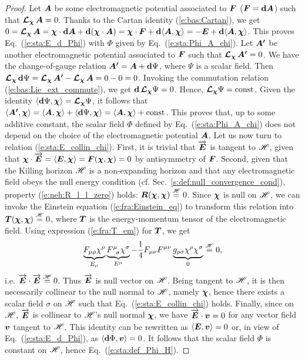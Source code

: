 \begin{proof}
Let $\bm{A}$ be some electromagnetic potential associated to $\bm{F}$ ($\bm{F} = \mathbf{d} \bm{A}$)
such that $\bm{\mathcal{L}}_{\bm{\chi}}\, \bm{A} = 0$.
Thanks to the Cartan identity (\ref{e:bas:Cartan}), we get
$0 = \bm{\mathcal{L}}_{\bm{\chi}}\, \bm{A} = \bm{\chi}\cdot\mathbf{d}\bm{A}
    + \mathbf{d}(\bm{\chi}\cdot\bm{A}) = \bm{\chi}\cdot\bm{F} + \mathbf{d} \langle \bm{A}, \bm{\chi} \rangle
    = -\bm{E} + \mathbf{d} \langle \bm{A}, \bm{\chi} \rangle $. This proves Eq.~(\ref{e:sta:E_d_Phi})
with $\Phi$ given by Eq.~(\ref{e:sta:Phi_A_chi}).
Let $\bm{A'}$ be another electromagnetic potential associated to $\bm{F}$
such that $\bm{\mathcal{L}}_{\bm{\chi}}\, \bm{A'} = 0$. We have the change-of-gauge relation
$\bm{A'} = \bm{A} + \mathbf{d}\Psi$, where $\Psi$ is a scalar field.
Then $\bm{\mathcal{L}}_{\bm{\chi}}\, \mathbf{d}\Psi = \bm{\mathcal{L}}_{\bm{\chi}}\, \bm{A'}  - \bm{\mathcal{L}}_{\bm{\chi}}\, \bm{A} = 0 - 0 = 0$.
Invoking the commutation relation (\ref{e:bas:Lie_ext_commute}), we get
$\mathbf{d} \, \bm{\mathcal{L}}_{\bm{\chi}}\,\! \Psi = 0$. Hence, $\bm{\mathcal{L}}_{\bm{\chi}}\,\! \Psi = \mathrm{const}$.
Given the identity $\langle \mathbf{d} \Psi, \bm{\chi} \rangle = \bm{\mathcal{L}}_{\bm{\chi}}\,\! \Psi$,
it follows that $\langle \bm{A'}, \bm{\chi} \rangle = \langle \bm{A}, \bm{\chi} \rangle
+ \langle \mathbf{d} \Psi, \bm{\chi} \rangle = \langle \bm{A}, \bm{\chi} \rangle  + \mathrm{const}$.
This proves that, up to some additive constant, the scalar field $\Phi$ defined by Eq.~(\ref{e:sta:Phi_A_chi}) does not depend on the choice of the electromagnetic potential
$\bm{A}$. Let us now turn to relation (\ref{e:sta:E_collin_chi}). First, it is trivial
that $\overrightarrow{\bm{E}}$ is tangent to $\mathscr{H}$, given that $\bm{\chi}\cdot\overrightarrow{\bm{E}} = \langle \bm{E},\bm{\chi} \rangle = \bm{F}(\bm{\chi}, \bm{\chi}) = 0$ by antisymmetry of $\bm{F}$.
Second, given that the Killing horizon $\mathscr{H}$ is a non-expanding horizon and that
any electromagnetic field obeys the null energy condition
(cf. Sec.~\ref{s:def:null_convergence_cond}), property (\ref{e:neh:R_l_l_zero})
holds: $\bm{R}(\bm{\chi},\bm{\chi}) \stackrel{\mathscr{H}}{=} 0$. Since $\bm{\chi}$ is null on $\mathscr{H}$,
we can invoke the Einstein equation (\ref{e:fra:Einstein_eq}) to
transform this relation into $\bm{T}(\bm{\chi},\bm{\chi}) \stackrel{\mathscr{H}}{=} 0$, where
$\bm{T}$ is the energy-momentum tensor of the electromagnetic field.
Using expression (\ref{e:fra:T_em}) for $\bm{T}$, we get
\[
    \underbrace{F_{\mu\rho} \chi^\rho}_{E_\mu}
    \underbrace{F^\mu_{\ \, \sigma} \chi^\sigma}_{E^\mu}
    - \frac{1}{4}  F_{\mu\nu} F^{\mu\nu}
    \underbrace{g_{\rho\sigma} \chi^\rho \chi^\sigma}_{0} \stackrel{\mathscr{H}}{=} 0 ,
\]
i.e. $\overrightarrow{\bm{E}}\cdot\overrightarrow{\bm{E}} \stackrel{\mathscr{H}}{=} 0$. Thus $\overrightarrow{\bm{E}}$ is null vector on $\mathscr{H}$.
Being tangent to $\mathscr{H}$, it is then necessarily collinear to the null normal
to $\mathscr{H}$, namely $\bm{\chi}$, hence there exists a scalar field $\sigma$ on $\mathscr{H}$
such that Eq.~(\ref{e:sta:E_collin_chi}) holds.
Finally, since on $\mathscr{H}$, $\overrightarrow{\bm{E}}$ is collinear to $\mathscr{H}$'s null normal $\bm{\chi}$,
we have $\overrightarrow{\bm{E}}\cdot\bm{v} = 0$ for any vector field $\bm{v}$ tangent to $\mathscr{H}$.
This identity can be rewritten as $\langle \bm{E}, \bm{v} \rangle = 0$ or,
in view of Eq.~(\ref{e:sta:E_d_Phi}), as $\langle \mathbf{d}\Phi,  \bm{v} \rangle = 0$.
It follows that the scalar field $\Phi$ is constant on $\mathscr{H}$, hence Eq.~(\ref{e:sta:def_Phi_H}).
\end{proof}

